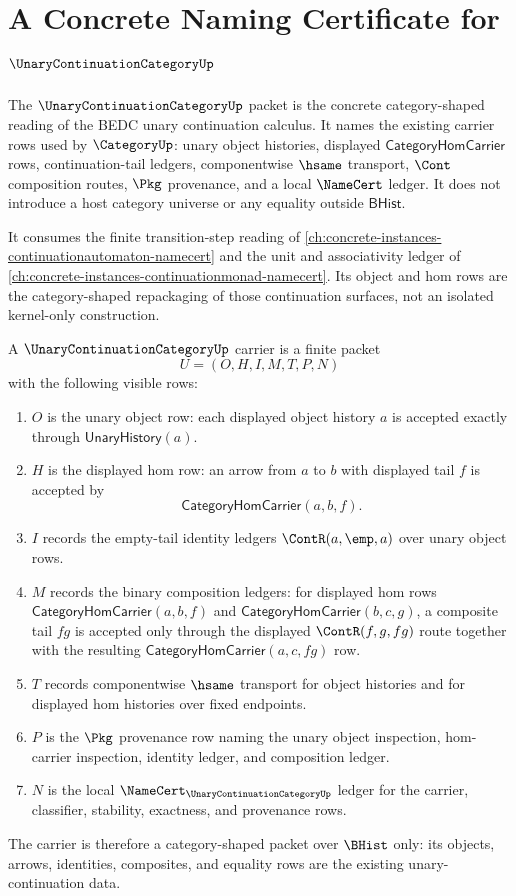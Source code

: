 \chapter{A Concrete Naming Certificate for $\UnaryContinuationCategoryUp$}
\label{ch:concrete-instances-unary-continuation-category-namecert}

The $\UnaryContinuationCategoryUp$ packet is the concrete category-shaped reading of the BEDC unary continuation calculus. It names the existing carrier rows used by $\CategoryUp$: unary object histories, displayed $\mathsf{CategoryHomCarrier}$ rows, continuation-tail ledgers, componentwise $\hsame$ transport, $\Cont$ composition routes, $\Pkg$ provenance, and a local $\NameCert$ ledger. It does not introduce a host category universe or any equality outside $\mathsf{BHist}$.

It consumes the finite transition-step reading of \autoref{ch:concrete-instances-continuationautomaton-namecert} and the unit and associativity ledger of \autoref{ch:concrete-instances-continuationmonad-namecert}. Its object and hom rows are the category-shaped repackaging of those continuation surfaces, not an isolated kernel-only construction.

\begin{definition}
\label{def:unary-continuation-category-carrier}
A $\UnaryContinuationCategoryUp$ carrier is a finite packet
$$
U=(O,H,I,M,T,P,N)
$$
with the following visible rows:
\begin{enumerate}
\item $O$ is the unary object row: each displayed object history $a$ is accepted exactly through $\mathsf{UnaryHistory}(a)$.
\item $H$ is the displayed hom row: an arrow from $a$ to $b$ with displayed tail $f$ is accepted by
$$
\mathsf{CategoryHomCarrier}(a,b,f).
$$
\item $I$ records the empty-tail identity ledgers $\ContR(a,\emp,a)$ over unary object rows.
\item $M$ records the binary composition ledgers: for displayed hom rows $\mathsf{CategoryHomCarrier}(a,b,f)$ and $\mathsf{CategoryHomCarrier}(b,c,g)$, a composite tail $fg$ is accepted only through the displayed $\ContR(f,g,fg)$ route together with the resulting $\mathsf{CategoryHomCarrier}(a,c,fg)$ row.
\item $T$ records componentwise $\hsame$ transport for object histories and for displayed hom histories over fixed endpoints.
\item $P$ is the $\Pkg$ provenance row naming the unary object inspection, hom-carrier inspection, identity ledger, and composition ledger.
\item $N$ is the local $\NameCert_{\UnaryContinuationCategoryUp}$ ledger for the carrier, classifier, stability, exactness, and provenance rows.
\end{enumerate}
The carrier is therefore a category-shaped packet over $\BHist$ only: its objects, arrows, identities, composites, and equality rows are the existing unary-continuation data.
\end{definition}

